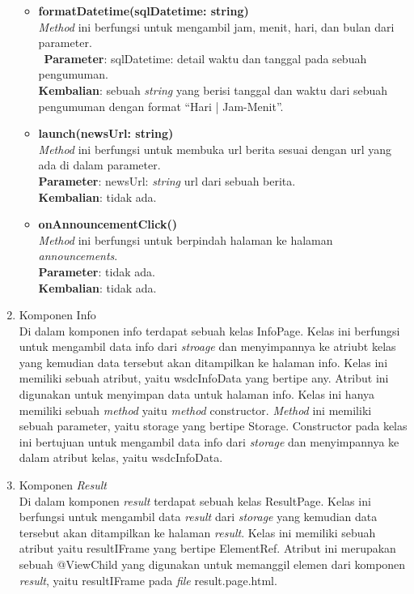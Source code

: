 \begin{enumerate}
\begin{itemize}
		\item \textbf{formatDatetime(sqlDatetime: string)}\\
			\textit{Method} ini berfungsi untuk mengambil jam, menit, hari, dan bulan dari parameter. \\\
			\textbf{Parameter}: sqlDatetime: detail waktu dan tanggal pada sebuah pengumuman. \\
			\textbf{Kembalian}: sebuah \textit{string} yang berisi tanggal dan waktu dari sebuah pengumuman dengan format ``Hari | Jam-Menit''.
			
		\item \textbf{launch(newsUrl: string)}\\
			\textit{Method} ini berfungsi untuk membuka url berita sesuai dengan url yang ada di dalam parameter. \\
			\textbf{Parameter}: newsUrl: \textit{string} url dari sebuah berita. \\
			\textbf{Kembalian}: tidak ada.
			
		\item \textbf{onAnnouncementClick()} \\
			\textit{Method} ini berfungsi untuk berpindah halaman ke halaman \textit{announcements}.\\
			\textbf{Parameter}: tidak ada.\\
			\textbf{Kembalian}: tidak ada.
	\end{itemize}
	
	\newpage
	\item Komponen Info \\
		Di dalam komponen info terdapat sebuah kelas InfoPage. Kelas ini berfungsi untuk mengambil data info dari \textit{stroage} dan menyimpannya ke atriubt kelas yang kemudian data tersebut akan ditampilkan ke halaman info. Kelas ini memiliki sebuah atribut, yaitu wsdcInfoData yang bertipe any. Atribut ini digunakan untuk menyimpan data untuk halaman info. Kelas ini hanya memiliki sebuah \textit{method} yaitu \textit{method} constructor. \textit{Method} ini memiliki sebuah parameter, yaitu storage yang bertipe Storage. Constructor pada kelas ini bertujuan untuk mengambil data info dari \textit{storage} dan menyimpannya ke dalam atribut kelas, yaitu wsdcInfoData. 
		
	\item Komponen \textit{Result} \\
		Di dalam komponen \textit{result} terdapat sebuah kelas ResultPage. Kelas ini berfungsi untuk mengambil data \textit{result} dari \textit{storage} yang kemudian data tersebut akan ditampilkan ke halaman \textit{result}. Kelas ini memiliki sebuah atribut yaitu resultIFrame yang bertipe ElementRef. Atribut ini merupakan sebuah @ViewChild yang digunakan untuk memanggil elemen dari komponen \textit{result}, yaitu resultIFrame pada \textit{file} result.page.html. 
		

\end{enumerate}
